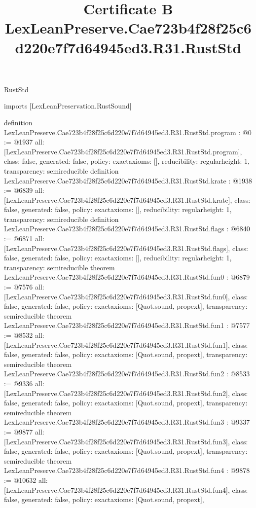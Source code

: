 \begin{lexlean}{RustStd}
\title{Certificate B LexLeanPreserve.Cae723b4f28f25c6d220e7f7d64945ed3.R31.RustStd}
\begin{coremodule}
imports [LexLeanPreservation.RustSound]

definition LexLeanPreserve.Cae723b4f28f25c6d220e7f7d64945ed3.R31.RustStd.program : @0 := @1937 {
  all: [LexLeanPreserve.Cae723b4f28f25c6d220e7f7d64945ed3.R31.RustStd.program],
  class: false,
  generated: false,
  policy: exact{axioms: []},
  reducibility: regular{height: 1},
  transparency: semireducible
}
definition LexLeanPreserve.Cae723b4f28f25c6d220e7f7d64945ed3.R31.RustStd.krate : @1938 := @6839 {
  all: [LexLeanPreserve.Cae723b4f28f25c6d220e7f7d64945ed3.R31.RustStd.krate],
  class: false,
  generated: false,
  policy: exact{axioms: []},
  reducibility: regular{height: 1},
  transparency: semireducible
}
definition LexLeanPreserve.Cae723b4f28f25c6d220e7f7d64945ed3.R31.RustStd.flags : @6840 := @6871 {
  all: [LexLeanPreserve.Cae723b4f28f25c6d220e7f7d64945ed3.R31.RustStd.flags],
  class: false,
  generated: false,
  policy: exact{axioms: []},
  reducibility: regular{height: 1},
  transparency: semireducible
}
theorem LexLeanPreserve.Cae723b4f28f25c6d220e7f7d64945ed3.R31.RustStd.fun0 : @6879 := @7576 {
  all: [LexLeanPreserve.Cae723b4f28f25c6d220e7f7d64945ed3.R31.RustStd.fun0],
  class: false,
  generated: false,
  policy: exact{axioms: [Quot.sound, propext]},
  transparency: semireducible
}
theorem LexLeanPreserve.Cae723b4f28f25c6d220e7f7d64945ed3.R31.RustStd.fun1 : @7577 := @8532 {
  all: [LexLeanPreserve.Cae723b4f28f25c6d220e7f7d64945ed3.R31.RustStd.fun1],
  class: false,
  generated: false,
  policy: exact{axioms: [Quot.sound, propext]},
  transparency: semireducible
}
theorem LexLeanPreserve.Cae723b4f28f25c6d220e7f7d64945ed3.R31.RustStd.fun2 : @8533 := @9336 {
  all: [LexLeanPreserve.Cae723b4f28f25c6d220e7f7d64945ed3.R31.RustStd.fun2],
  class: false,
  generated: false,
  policy: exact{axioms: [Quot.sound, propext]},
  transparency: semireducible
}
theorem LexLeanPreserve.Cae723b4f28f25c6d220e7f7d64945ed3.R31.RustStd.fun3 : @9337 := @9877 {
  all: [LexLeanPreserve.Cae723b4f28f25c6d220e7f7d64945ed3.R31.RustStd.fun3],
  class: false,
  generated: false,
  policy: exact{axioms: [Quot.sound, propext]},
  transparency: semireducible
}
theorem LexLeanPreserve.Cae723b4f28f25c6d220e7f7d64945ed3.R31.RustStd.fun4 : @9878 := @10632 {
  all: [LexLeanPreserve.Cae723b4f28f25c6d220e7f7d64945ed3.R31.RustStd.fun4],
  class: false,
  generated: false,
  policy: exact{axioms: [Quot.sound, propext]},
}
\end{coremodule}
\end{lexlean}
